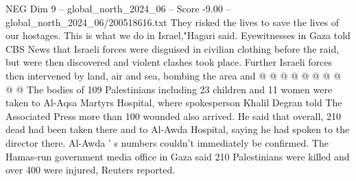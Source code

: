 \begin{textsample}{NEG Dim 9 – global\_north\_2024\_06 – Score -9.00 – global\_north\_2024\_06/200518616.txt}
They risked the lives to save the lives of our hostages.
This is what we do in Israel,"Hagari said.
Eyewitnesses in Gaza told CBS News that Israeli forces were disguised in civilian clothing before the raid, but were then discovered and violent clashes took place.
Further Israeli forces then intervened by land, air and sea, bombing the area and @ @ @ @ @ @ @ @ @ @ The bodies of 109 Palestinians including 23 children and 11 women were taken to Al-Aqsa Martyrs Hospital, where spokesperson Khalil Degran told The Associated Press more than 100 wounded also arrived.
He said that overall, 210 dead had been taken there and to Al-Awda Hospital, saying he had spoken to the director there.
Al-Awda ' s numbers couldn't immediately be confirmed.
The Hamas-run government media office in Gaza said 210 Palestinians were killed and over 400 were injured, Reuters reported.

\end{textsample}
